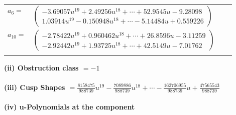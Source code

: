 \documentclass[1p]{elsarticle_modified}
\theoremstyle{definition}
\begin{document}
\begin{tabular}{m{7pt} m{180pt} m{7pt} m{180pt} }
\flushright $a_{6}=$&$\begin{pmatrix}-3.69057 u^{19}+2.49256 u^{18}+\cdots+52.9545 u-9.28098\\1.03914 u^{19}-0.150948 u^{18}+\cdots-5.14484 u+0.559226\end{pmatrix}$ \\
\flushright $a_{10}=$&$\begin{pmatrix}-2.78422 u^{19}+0.960462 u^{18}+\cdots+26.8596 u-3.11259\\-2.92442 u^{19}+1.93725 u^{18}+\cdots+42.5149 u-7.01762\end{pmatrix}$\\&\end{tabular}
\flushleft \textbf{(ii) Obstruction class $= -1$}\\~\\
\flushleft \textbf{(iii) Cusp Shapes $= \frac{8158475}{988739} u^{19}-\frac{7089886}{988739} u^{18}+\cdots-\frac{162706955}{988739} u+\frac{47565543}{988739}$}\\~\\
\newpage\renewcommand{\arraystretch}{1}
\flushleft \textbf{(iv) u-Polynomials at the component}\newline \\
\end{document}

